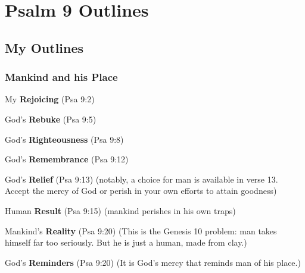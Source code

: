 \section{Psalm 9 Outlines}

\subsection{My Outlines}

\subsubsection{Mankind and his Place}


\begin{compactenum}[I.]
    \item My \textbf{Rejoicing} (Psa 9:2)
    \item God's \textbf{Rebuke} (Psa 9:5)
    \item God's \textbf{Righteousness} (Psa 9:8)
    \item God's \textbf{Remembrance} (Psa 9:12)
    \item God's \textbf{Relief} (Psa 9:13) (notably, a choice for man is available in verse 13.  Accept the mercy of God or perish in your own efforts to attain goodness)
    \item Human \textbf{Result} (Psa 9:15) (mankind perishes in his own traps)
    \item Mankind's \textbf{Reality} (Psa 9:20) (This is the Genesis 10 problem: man takes himself far too seriously. But he is just a human, made from  clay.)
    \item God's \textbf{Reminders} (Psa 9:20) (It is God's mercy that reminds man of his place.)
\end{compactenum}

